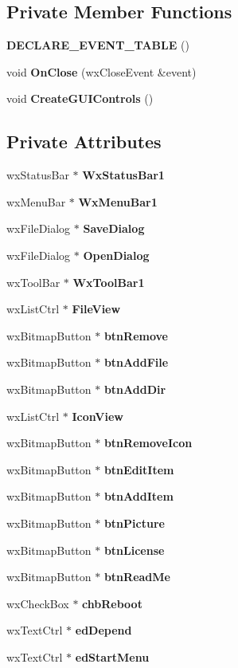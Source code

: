 \subsection*{Private Member Functions}
\begin{CompactItemize}
\item 
{\bf DECLARE\_\-EVENT\_\-TABLE} ()
\item 
void {\bf On\-Close} (wx\-Close\-Event \&event)
\item 
void {\bf Create\-GUIControls} ()
\end{CompactItemize}
\subsection*{Private Attributes}
\begin{CompactItemize}
\item 
wx\-Status\-Bar $\ast$ {\bf Wx\-Status\-Bar1}
\item 
wx\-Menu\-Bar $\ast$ {\bf Wx\-Menu\-Bar1}
\item 
wx\-File\-Dialog $\ast$ {\bf Save\-Dialog}
\item 
wx\-File\-Dialog $\ast$ {\bf Open\-Dialog}
\item 
wx\-Tool\-Bar $\ast$ {\bf Wx\-Tool\-Bar1}
\item 
wx\-List\-Ctrl $\ast$ {\bf File\-View}
\item 
wx\-Bitmap\-Button $\ast$ {\bf btn\-Remove}
\item 
wx\-Bitmap\-Button $\ast$ {\bf btn\-Add\-File}
\item 
wx\-Bitmap\-Button $\ast$ {\bf btn\-Add\-Dir}
\item 
wx\-List\-Ctrl $\ast$ {\bf Icon\-View}
\item 
wx\-Bitmap\-Button $\ast$ {\bf btn\-Remove\-Icon}
\item 
wx\-Bitmap\-Button $\ast$ {\bf btn\-Edit\-Item}
\item 
wx\-Bitmap\-Button $\ast$ {\bf btn\-Add\-Item}
\item 
wx\-Bitmap\-Button $\ast$ {\bf btn\-Picture}
\item 
wx\-Bitmap\-Button $\ast$ {\bf btn\-License}
\item 
wx\-Bitmap\-Button $\ast$ {\bf btn\-Read\-Me}
\item 
wx\-Check\-Box $\ast$ {\bf chb\-Reboot}
\item 
wx\-Text\-Ctrl $\ast$ {\bf ed\-Depend}
\item 
wx\-Text\-Ctrl $\ast$ {\bf ed\-Start\-Menu}
\item 

\end{CompactItemize}
